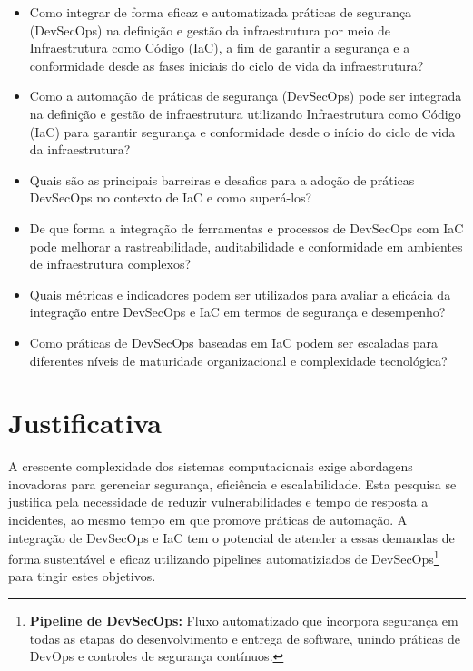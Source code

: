 \begin{itemize}
    \item Como integrar de forma eficaz e automatizada práticas de segurança (DevSecOps) na definição e gestão da infraestrutura por meio de Infraestrutura como Código (IaC), a fim de garantir a segurança e a conformidade desde as fases iniciais do ciclo de vida da infraestrutura?
    \item Como a automação de práticas de segurança (DevSecOps) pode ser integrada na definição e gestão de infraestrutura utilizando Infraestrutura como Código (IaC) para garantir segurança e conformidade desde o início do ciclo de vida da infraestrutura?
    \item Quais são as principais barreiras e desafios para a adoção de práticas DevSecOps no contexto de IaC e como superá-los?
    \item De que forma a integração de ferramentas e processos de DevSecOps com IaC pode melhorar a rastreabilidade, auditabilidade e conformidade em ambientes de infraestrutura complexos?
    \item Quais métricas e indicadores podem ser utilizados para avaliar a eficácia da integração entre DevSecOps e IaC em termos de segurança e desempenho?
    \item Como práticas de DevSecOps baseadas em IaC podem ser escaladas para diferentes níveis de maturidade organizacional e complexidade tecnológica?

\end{itemize}


\section{Justificativa}

 A crescente complexidade dos sistemas computacionais exige abordagens inovadoras para
gerenciar segurança, eficiência e escalabilidade. Esta pesquisa se justifica pela necessidade de reduzir vulnerabilidades e tempo de resposta a incidentes, ao mesmo tempo em que promove práticas de automação. A integração de DevSecOps e IaC tem o potencial de atender a essas demandas de forma sustentável e eficaz utilizando pipelines automatiziados de DevSecOps\footnote{\textbf{Pipeline de DevSecOps:} Fluxo automatizado que incorpora segurança em todas as etapas do desenvolvimento e entrega de software, unindo práticas de DevOps e controles de segurança contínuos.} para tingir estes objetivos.


